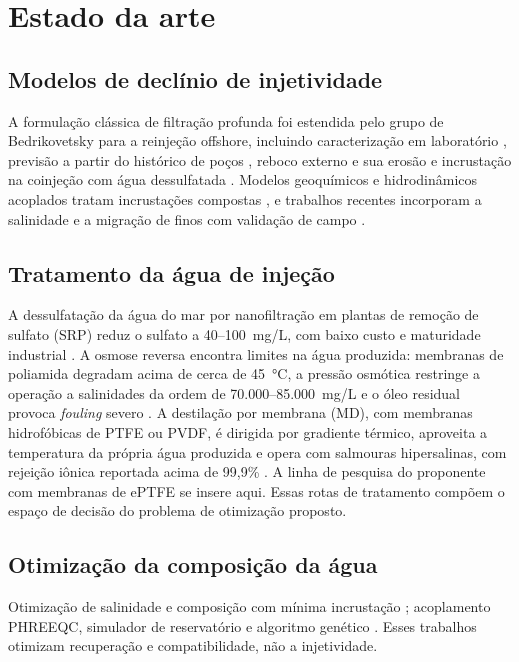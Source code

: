 \documentclass[11pt,a4paper]{article}
\newcommand{\itemedital}[1]{}
\begin{document}
\section{Estado da arte}\itemedital{2.16 IX}

\subsection{Modelos de declínio de injetividade}
A formulação clássica de filtração profunda \cite{pangsharma1997,sharma1987} foi estendida
pelo grupo de Bedrikovetsky para a reinjeção offshore, incluindo caracterização em
laboratório \cite{bedrikovetsky2001}, previsão a partir do histórico de poços
\cite{bedrikovetsky2005}, reboco externo e sua erosão
\cite{paiva2007,yuan2012,yerramilli2015} e incrustação na coinjeção com água dessulfatada
\cite{bedrikovetsky2009}. Modelos geoquímicos e hidrodinâmicos acoplados tratam
incrustações compostas \cite{shabani2019}, e trabalhos recentes incorporam a salinidade e a
migração de finos com validação de campo \cite{salinity2021}.

\subsection{Tratamento da água de injeção}
A dessulfatação da água do mar por nanofiltração em plantas de remoção de sulfato (SRP)
reduz o sulfato a 40--100~mg/L, com baixo custo e maturidade industrial \cite{bader2007}.
A osmose reversa encontra limites na água produzida: membranas de poliamida degradam
acima de cerca de 45~°C, a pressão osmótica restringe a operação a salinidades da ordem de
70.000--85.000~mg/L e o óleo residual provoca \textit{fouling} severo
\cite{alsalmi2020,pawar2022,hsieh2023}. A destilação por membrana (MD), com membranas
hidrofóbicas de PTFE ou PVDF, é dirigida por gradiente térmico, aproveita a temperatura da
própria água produzida e opera com salmouras hipersalinas, com rejeição iônica reportada
acima de 99,9\% \cite{macedonio2014,alsalmi2020,pawar2022}. A linha de pesquisa do
proponente com membranas de ePTFE se insere aqui. Essas rotas de tratamento compõem o
espaço de decisão do problema de otimização proposto.

\subsection{Otimização da composição da água}
Otimização de salinidade e composição com mínima incrustação \cite{scirep2023};
acoplamento PHREEQC, simulador de reservatório e algoritmo genético \cite{carbonate2021}.
Esses trabalhos otimizam recuperação e compatibilidade, não a injetividade.
\end{document}
